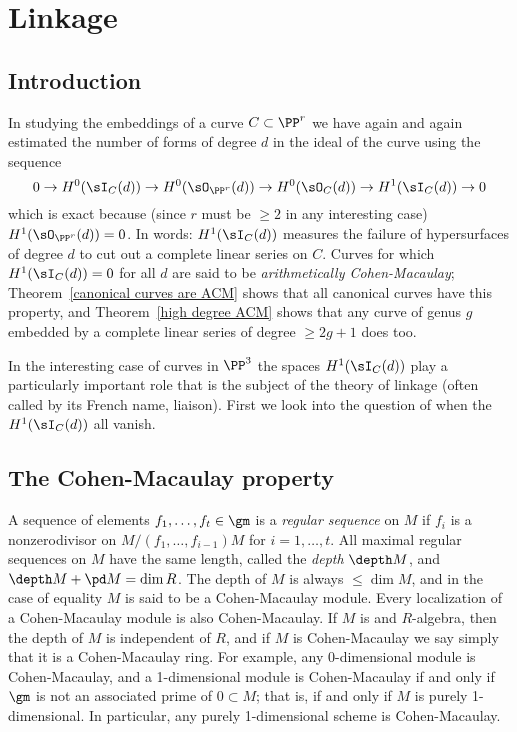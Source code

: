 

\chapter{Linkage}
\label{LiaisonChapter}\label{linkageChapter}


\section{Introduction} 


In studying the embeddings of a curve $C\subset \PP^r$  we have again and again estimated the number of
forms of degree $d$ in the ideal of the curve using the sequence
$$
0\to H^0(\sI_C(d)) \to H^0(\sO_{\PP^r}(d))\to  H^0(\sO_C(d)) \to H^1(\sI_C(d))\to 0
$$
which is exact because (since $r$ must be $\geq 2$ in any interesting case) $H^1(\sO_{\PP^r}(d))= 0$. In words: 
$H^1(\sI_C(d))$ measures the failure of hypersurfaces of degree $d$ to cut out a complete linear series on $C$. Curves for which
$H^1(\sI_C(d))=0$ for all $d$ are said to be \emph{arithmetically Cohen-Macaulay}; Theorem~\ref{canonical curves are ACM} shows that
all canonical curves have this property, and Theorem~\ref{high degree ACM} shows that any curve of genus $g$ embedded by a
 complete linear series of degree $\geq 2g+1$ does too.
  
In the interesting case of curves in $\PP^3$ the spaces $H^1(\sI_C(d))$ play a particularly important role that is
the subject of the theory of linkage (often called by its French name, liaison). First we look into the question of when the $H^1(\sI_C(d))$
all vanish.

\section{The Cohen-Macaulay property}
A sequence of elements $f_1,\dots, f_t\in \gm$ is a \emph{regular sequence} on $M$ if $f_i$ is a nonzerodivisor on $M/(f_1, \dots, f_{i-1})M$
for $i = 1,\dots,t$. 
All maximal regular sequences on $M$ have the same length, called the \emph{depth}  $\depth M$, and 
$\depth M + \pd M = \dim R$. The depth of $M$ is always $\leq \dim M$, and in the case of equality $M$ is said to be a Cohen-Macaulay module. Every
localization of a Cohen-Macaulay module is also Cohen-Macaulay. If $M$ is and $R$-algebra, then the depth of $M$ is independent
of $R$, and if $M$ is Cohen-Macaulay we say simply that it is a Cohen-Macaulay ring. For example, any 0-dimensional module is Cohen-Macaulay,
and a 1-dimensional module is Cohen-Macaulay if and only if $\gm$ is not an associated prime of $0\subset M$; that is, if and only if $M$ is purely 1-dimensional. In particular, any purely 1-dimensional scheme is Cohen-Macaulay.

